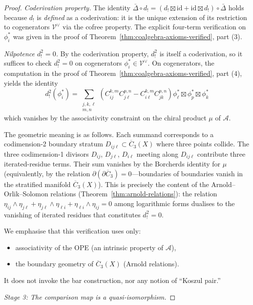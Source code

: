 \begin{proof}
\emph{Coderivation property.}  The identity $\bar\Delta \circ d_! = (d_! \boxtimes \mathrm{id} + \mathrm{id} \boxtimes d_!) \circ \bar\Delta$ holds because $d_!$ is \emph{defined} as a coderivation: it is the unique extension of its restriction to cogenerators $\mathcal{V}^{\vee}$ via the cofree property.  The explicit four-term verification on $\phi_i^*$ was given in the proof of Theorem~\ref{thm:coalgebra-axioms-verified}, part (3).

\emph{Nilpotence $d_!^2 = 0$.}  By the coderivation property, $d_!^2$ is itself a coderivation, so it suffices to check $d_!^2 = 0$ on cogenerators $\phi_i^* \in \mathcal{V}^{\vee}$.  On cogenerators, the computation in the proof of Theorem~\ref{thm:coalgebra-axioms-verified}, part (4), yields the identity
\[d_!^2(\phi_i^*) = \sum_{\substack{j,k,\ell \\ m,n}} \left(C_{ij}^{k,m} C_{j\ell}^{p,n} - C_{i\ell}^{k,m} C_{jk}^{p,n}\right) \phi_\ell^* \boxtimes \phi_p^* \boxtimes \phi_k^*\]
which vanishes by the associativity constraint on the chiral product $\mu$ of $\mathcal{A}$.

The geometric meaning is as follows.  Each summand corresponds to a codimension-2 boundary stratum $D_{ij\ell} \subset \overline{C}_3(X)$ where three points collide.  The three codimension-1 divisors $D_{ij}$, $D_{j\ell}$, $D_{i\ell}$ meeting along $D_{ij\ell}$ contribute three iterated-residue terms.  Their sum vanishes by the Borcherds identity for $\mu$ (equivalently, by the relation $\partial(\partial \overline{C}_3) = 0$---boundaries of boundaries vanish in the stratified manifold $\overline{C}_3(X)$).  This is precisely the content of the Arnold--Orlik--Solomon relations (Theorem~\ref{thm:arnold-relations}): the relation $\eta_{ij} \wedge \eta_{j\ell} + \eta_{j\ell} \wedge \eta_{\ell i} + \eta_{\ell i} \wedge \eta_{ij} = 0$ among logarithmic forms dualises to the vanishing of iterated residues that constitutes $d_!^2 = 0$.

We emphasise that this verification uses only:
\begin{itemize}
\item associativity of the OPE (an intrinsic property of $\mathcal{A}$),
\item the boundary geometry of $\overline{C}_3(X)$ (Arnold relations).
\end{itemize}
It does not invoke the bar construction, nor any notion of ``Koszul pair.''

\medskip
\noindent\emph{Stage 3: The comparison map is a quasi-isomorphism.}


\end{proof}
